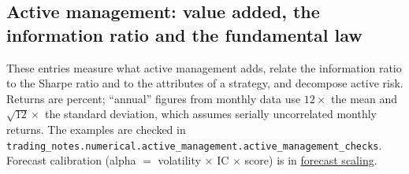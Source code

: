 \subsection{Active management: value added, the information ratio and the fundamental law}

These entries measure what active management adds, relate the information ratio to the Sharpe ratio and to the attributes of a strategy, and decompose active risk. Returns are percent; ``annual'' figures from monthly data use $12\times$ the mean and $\sqrt{12}\times$ the standard deviation, which assumes serially uncorrelated monthly returns. The examples are checked in \nolinkurl{trading_notes.numerical.active_management.active_management_checks}. Forecast calibration (alpha $=$ volatility $\times$ IC $\times$ score) is in \hyperref[meth:forecast-scaling-ic]{forecast scaling}.

